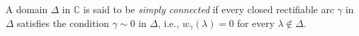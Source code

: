 A domain $\Delta$ in $\mathbb{C}$ is said to be \textit{simply connected} if every closed rectifiable arc $\gamma$ in $\Delta$ satisfies the condition $\gamma \sim 0$ in $\Delta$, i.e., $w_{\gamma}(\lambda) = 0$ for every $\lambda \notin \Delta$.
